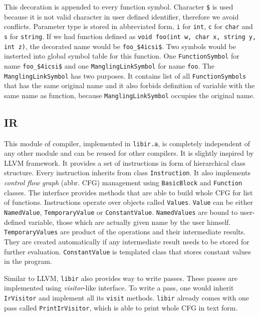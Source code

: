 \documentclass[12pt]{article}
\begin{document}
This decoration is appended to every function symbol. Character \texttt{\$} is used because it is not valid character in user defined identifier, therefore
we avoid conflicts. Parameter type is stored in abbreviated form, \texttt{i} for \texttt{int}, \texttt{c} for \texttt{char} and \texttt{s} for \texttt{string}.
If we had function defined as \texttt{void foo(int w, char x, string y, int z)}, the decorated name would be \texttt{foo\_\$4icsi\$}.
Two symbols would be insterted into global symbol table for this function. One \texttt{FunctionSymbol} for name \texttt{foo\_\$4icsi\$} and
one \texttt{ManglingLinkSymbol} for name \texttt{foo}. The \texttt{ManglingLinkSymbol} has two purposes. It contains list of all \texttt{FunctionSymbols} that has the same
original name and it also forbids definition of variable with the same name as function, because \texttt{ManglingLinkSymbol} occupies the original name.

\subsection{IR}
This module of compiler, implemented in \texttt{libir.a}, is completely independent of any other module and can be reused for other compilers. It is slightly
inspired by LLVM framework. It provides a set of instructions in form of hierarchical class structure. Every instruction inherits from class \texttt{Instruction}.
It also implements \emph{control flow graph} (abbr. CFG) management using \texttt{BasicBlock} and \texttt{Function} classes. The interface provides methods
that are able to build whole CFG for list of functions. Instructions operate over objects called \texttt{Values}. \texttt{Value} can be either \texttt{NamedValue},
\texttt{TemporaryValue} or \texttt{ConstantValue}. \texttt{NamedValues} are bound to user-defined variable, those which are actually given name by the user himself.
\texttt{TemporaryValues} are product of the operations and their intermediate results. They are created automatically if any intermediate result needs to be stored
for further evaluation. \texttt{ConstantValue} is templated class that stores constant values in the program.

Similar to LLVM, \texttt{libir} also provides way to write passes. These passes are implemented using \emph{visitor}-like interface. To write a pass, one would
inherit \texttt{IrVisitor} and implement all its \texttt{visit} methods. \texttt{libir} already comes with one pass called \texttt{PrintIrVisitor}, which
is able to print whole CFG in text form.
\end{document}
